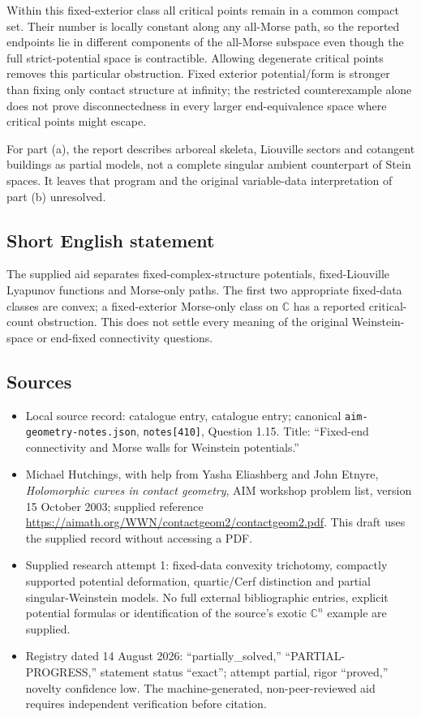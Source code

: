 \documentclass[11pt]{article}
\begin{document}
Within this fixed-exterior class all critical points remain in a common compact set. Their number is locally constant along any all-Morse path, so the reported endpoints lie in different components of the all-Morse subspace even though the full strict-potential space is contractible. Allowing degenerate critical points removes this particular obstruction. Fixed exterior potential/form is stronger than fixing only contact structure at infinity; the restricted counterexample alone does not prove disconnectedness in every larger end-equivalence space where critical points might escape.

For part (a), the report describes arboreal skeleta, Liouville sectors and cotangent buildings as partial models, not a complete singular ambient counterpart of Stein spaces. It leaves that program and the original variable-data interpretation of part (b) unresolved.
\subsection{Short English statement}
The supplied aid separates fixed-complex-structure potentials, fixed-Liouville Lyapunov functions and Morse-only paths. The first two appropriate fixed-data classes are convex; a fixed-exterior Morse-only class on \(\mathbb C\) has a reported critical-count obstruction. This does not settle every meaning of the original Weinstein-space or end-fixed connectivity questions.
\subsection{Sources}
\begin{itemize}
\item Local source record: catalogue entry, catalogue entry; canonical \texttt{aim-geometry-notes.json}, \texttt{notes[410]}, Question 1.15. Title: ``Fixed-end connectivity and Morse walls for Weinstein potentials.''
\item Michael Hutchings, with help from Yasha Eliashberg and John Etnyre, \emph{Holomorphic curves in contact geometry}, AIM workshop problem list, version 15 October 2003; supplied reference \url{https://aimath.org/WWN/contactgeom2/contactgeom2.pdf}. This draft uses the supplied record without accessing a PDF.
\item Supplied research attempt 1: fixed-data convexity trichotomy, compactly supported potential deformation, quartic/Cerf distinction and partial singular-Weinstein models. No full external bibliographic entries, explicit potential formulas or identification of the source's exotic \(\mathbb C^n\) example are supplied.
\item Registry dated 14 August 2026: ``partially\_solved,'' ``PARTIAL-PROGRESS,'' statement status ``exact''; attempt partial, rigor ``proved,'' novelty confidence low. The machine-generated, non-peer-reviewed aid requires independent verification before citation.
\end{itemize}
\end{document}
